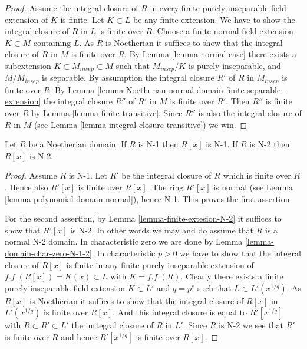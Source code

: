 \begin{proof}
Assume the integral closure of $R$ in every finite purely inseparable
field extension of $K$ is finite.
Let $K \subset L$ be any finite extension. We have to show the
integral closure of $R$ in $L$ is finite over $R$.
Choose a finite normal field extension $K \subset M$
containing $L$. As $R$ is Noetherian it suffices to show that
the integral closure of $R$ in $M$ is finite over $R$.
By Lemma \ref{lemma-normal-case}
there exists a subextension $K \subset M_{insep} \subset M$
such that $M_{insep}/K$ is purely inseparable, and $M/M_{insep}$
is separable. By assumption the integral closure $R'$ of $R$ in
$M_{insep}$ is finite over $R$. By
Lemma \ref{lemma-Noetherian-normal-domain-finite-separable-extension}
the integral
closure $R''$ of $R'$ in $M$ is finite over $R'$. Then $R''$ is finite
over $R$ by Lemma \ref{lemma-finite-transitive}.
Since $R''$ is also the integral closure
of $R$ in $M$ (see Lemma \ref{lemma-integral-closure-transitive}) we win.
\end{proof}

\begin{lemma}
\label{lemma-polynomial-ring-N-2}
Let $R$ be a Noetherian domain.
If $R$ is N-1 then $R[x]$ is N-1.
If $R$ is N-2 then $R[x]$ is N-2.
\end{lemma}

\begin{proof}
Assume $R$ is N-1. Let $R'$ be the integral closure of $R$
which is finite over $R$. Hence also $R'[x]$ is finite over
$R[x]$. The ring $R'[x]$ is normal (see
Lemma \ref{lemma-polynomial-domain-normal}), hence N-1.
This proves the first assertion.

\medskip\noindent
For the second assertion, by Lemma \ref{lemma-finite-extesion-N-2}
it suffices to show that $R'[x]$ is N-2. In other words we may
and do assume that $R$ is a normal N-2 domain. In characteristic zero
we are done by Lemma \ref{lemma-domain-char-zero-N-1-2}.
In characteristic $p > 0$ we have to show that the integral
closure of $R[x]$ is finite in any finite purely inseparable extension
of $f.f.(R[x]) = K(x) \subset L$ with $K = f.f.(R)$. Clearly there
exists a finite purely inseparable field extension $K \subset L'$
and $q = p^e$ such that $L \subset L'(x^{1/q})$. As $R[x]$ is
Noetherian it suffices to show that the integral closure of $R[x]$
in $L'(x^{1/q})$ is finite over $R[x]$. And this integral closure
is equal to $R'[x^{1/q}]$ with $R \subset R' \subset L'$ the inrtegral
closure of $R$ in $L'$.
Since $R$ is N-2 we see that $R'$ is finite over $R$ and hence
$R'[x^{1/q}]$ is finite over $R[x]$.
\end{proof}

